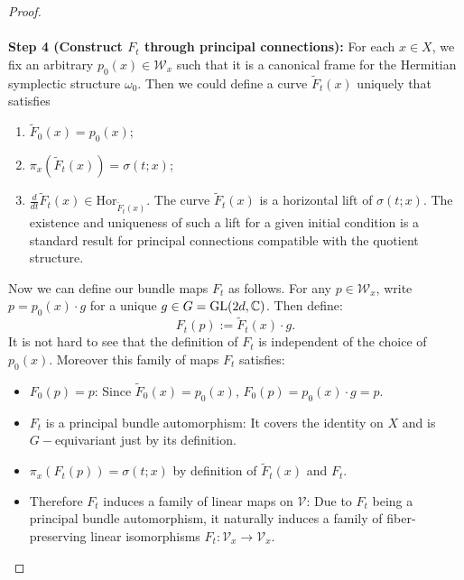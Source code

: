 \documentclass[11pt]{amsart}
\theoremstyle{remark}
\theoremstyle{definition}
\newcommand{\C}{{\mathbf C}}
\newcommand{\V}{{\mathbf V}}
\newcommand{\W}{{\mathbf W}}
\newcommand{\GL}{{\rm GL}}
\def \W{{\mathcal W}}
\def \C{{\mathcal{C}}}
\def \W{\mathcal{W}}
\def \V{\mathcal{V}}
\def\C{{\mathbb C}}
\begin{document}
\begin{proof}
\\
\\\textbf{ Step 4 (Construct $F_t$ through principal connections): }
For each $x \in X$, we fix an arbitrary $p_0(x)\in \W_x$ such that it is a canonical frame for the Hermitian symplectic structure $\omega_0$. Then we could define a curve $\tilde F_t(x)$ uniquely that satisfies
\begin{enumerate}
\item  $\tilde F_0(x)=p_0(x)$;
\item $\pi_x( \tilde F_t(x))=\sigma(t;x)$;
\item  $\frac{d}{dt}\tilde F_t(x)\in \mathrm{Hor}_{\tilde F_t(x)}$. The curve  $\tilde F_t(x)$ is a horizontal lift of $\sigma(t;x)$. The existence and uniqueness of such a lift for a given initial condition is a standard result for principal connections compatible with the quotient structure.
\end{enumerate}

Now we can define our bundle maps $F_t$ as follows. For any $p\in \W_x$,  write $p=p_0(x)\cdot g$ for a unique $g\in G=\GL(2d,\C)$. Then define:
$$F_t(p):=\tilde F_t(x)\cdot g.$$
It is not hard to see that the definition of $F_t$ is independent of the choice of $p_0(x)$. Moreover this family of maps $F_t$ satisfies:
\begin{itemize}
\item $F_0(p)=p$: Since $\tilde F_0(x)=p_0(x)$, $F_0(p)=p_0(x)\cdot g=p$.
\item $F_t$ is a principal bundle automorphism: It covers the identity on $X$ and is $G-$equivariant just by its definition.
\item $\pi_x(F_t(p)) = \sigma(t;x)$ by definition of $\tilde F_t(x)$ and $F_t$.
\item Therefore $F_t$ induces a family of linear maps on $\V$: Due to $F_t$ being a principal bundle automorphism, it naturally induces a family of fiber-preserving linear isomorphisms $F_t:\V_x\to \V_x$.
\end{itemize}


\end{proof}
\end{document}
